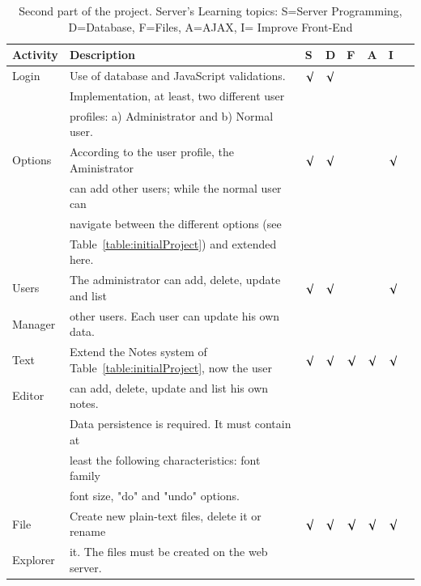 \begin{table}[htb]
    \begin{center}
        \caption{Second part of the project. Server's Learning topics: S=Server Programming, D=Database, F=Files, A=AJAX, I= Improve Front-End}
        \label{table:lastPartProject}
        \begin{tabular}{|l|l|l|l|l|l|l|l|}
        \hline
Activity&  Description                                      & S     & D     & F     & A     & I   \\\hline

Login   & Use of database and JavaScript validations.       &$\surd$&$\surd$&       &       &     \\
        & Implementation, at least, two different user      &       &       &       &       &     \\
        & profiles: a) Administrator and b) Normal user.    &       &       &       &       &     \\\hline
        
Options & According to the user profile, the Aministrator   &$\surd$&$\surd$&       &       &$\surd$\\
        & can add other users; while the normal user can    &       &       &       &       &     \\
        & navigate between the different options (see       &       &       &       &       &     \\
        &Table~\ref{table:initialProject}) and extended here.&       &       &       &       &     \\\hline

Users   & The administrator can add, delete, update and list&$\surd$&$\surd$&       &       &$\surd$\\
Manager & other users. Each user can update his own data.   &       &       &       &       &     \\\hline

Text   & Extend the Notes system of 
             Table~\ref{table:initialProject}, now the user &$\surd$&$\surd$&$\surd$&$\surd$&$\surd$\\
Editor  & can add, delete, update and list his own notes.   &       &       &       &       &     \\
        & Data persistence is required. It must contain at  &       &       &       &       &     \\
        & least the following characteristics: font family  &       &       &       &       &     \\
        & font size, "do" and "undo" options.               &       &       &       &       &     \\\hline

File    & Create new plain-text files, delete it or rename  &$\surd$&$\surd$&$\surd$&$\surd$&$\surd$\\
Explorer& it. The files must be created on the web server.  &       &       &       &       &     \\\hline  
        \end{tabular}
    \end{center}
\end{table}

